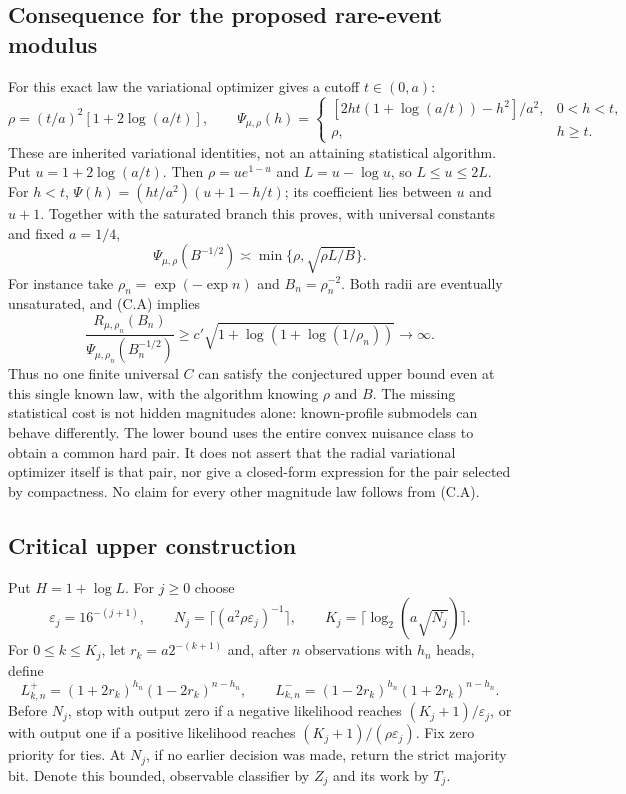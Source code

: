 \subsection{Consequence for the proposed rare-event modulus}
For this exact law the variational optimizer gives a cutoff $t\in(0,a)$:
\[
 \rho=(t/a)^2[1+2\log(a/t)],\qquad
 \Psi_{\mu,\rho}(h)=
 \begin{cases}
 [2ht(1+\log(a/t))-h^2]/a^2,&0<h<t,\\
 \rho,&h\ge t.
 \end{cases}                                          \tag{C.E}
\]
These are inherited variational identities, not an attaining statistical
algorithm. Put $u=1+2\log(a/t)$. Then $\rho=u e^{1-u}$ and
$L=u-\log u$, so $L\le u\le2L$. For $h<t$,
$\Psi(h)=(ht/a^2)(u+1-h/t)$; its coefficient lies between $u$ and $u+1$.
Together with the saturated branch this proves, with universal constants
and fixed $a=1/4$,
\[
 \Psi_{\mu,\rho}(B^{-1/2})\asymp\min\{\rho,\sqrt{\rho L/B}\}.
\]
For instance take $\rho_n=\exp(-\exp n)$ and $B_n=\rho_n^{-2}$.
Both radii are eventually unsaturated, and (C.A) implies
\[
 \frac{R_{\mu,\rho_n}(B_n)}{\Psi_{\mu,\rho_n}(B_n^{-1/2})}
       \ge c'\sqrt{1+\log(1+\log(1/\rho_n))}\longrightarrow\infty.
\]
Thus no one finite universal $C$ can
satisfy the conjectured upper bound even at this single known law, with
the algorithm knowing $\rho$ and $B$. The missing statistical cost is not
hidden magnitudes alone: known-profile submodels can behave differently.
The lower bound uses the entire convex nuisance class to obtain a common
hard pair. It does not assert that the radial variational optimizer itself
is that pair, nor give a closed-form expression for the pair selected by
compactness. No claim for every other magnitude law follows from (C.A).

\subsection{Critical upper construction}
Put $H=1+\log L$. For $j\ge0$ choose
\[
 \varepsilon_j=16^{-(j+1)},\qquad
 N_j=\lceil(a^2\rho\varepsilon_j)^{-1}\rceil,\qquad
 K_j=\lceil\log_2(a\sqrt{N_j})\rceil.
\]
For $0\le k\le K_j$, let $r_k=a2^{-(k+1)}$ and, after $n$ observations
with $h_n$ heads, define
\[
 L^+_{k,n}=(1+2r_k)^{h_n}(1-2r_k)^{n-h_n},\qquad
 L^-_{k,n}=(1-2r_k)^{h_n}(1+2r_k)^{n-h_n}.
\]
Before $N_j$, stop with output zero if a negative likelihood reaches
$(K_j+1)/\varepsilon_j$, or with output one if a positive likelihood reaches
$(K_j+1)/(\rho\varepsilon_j)$. Fix zero priority for ties. At $N_j$, if no
earlier decision was made, return the strict majority bit. Denote this bounded,
observable classifier by $Z_j$ and its work by $T_j$.

